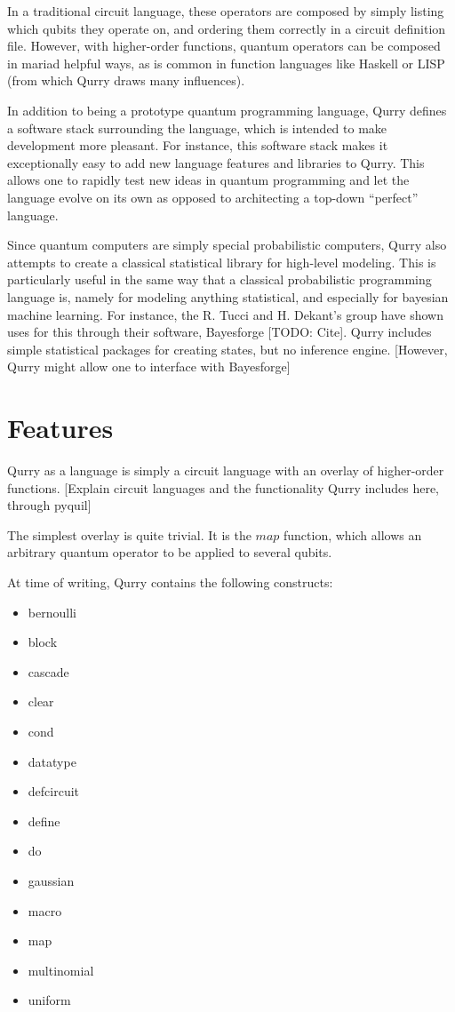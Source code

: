 \documentclass[journal]{IEEEtran}
\begin{document}
In a traditional circuit language, these operators are composed by simply listing which qubits they operate on, and ordering them correctly in a circuit definition file.
However, with higher-order functions, quantum operators can be composed in mariad helpful ways, as is common in function languages like Haskell or LISP (from which Qurry draws many influences).

In addition to being a prototype quantum programming language, Qurry defines a software stack surrounding the language, which is intended to make development more pleasant.
For instance, this software stack makes it exceptionally easy to add new language features and libraries to Qurry.
This allows one to rapidly test new ideas in quantum programming and let the language evolve on its own as opposed to architecting a top-down ``perfect'' language.

Since quantum computers are simply special probabilistic computers, Qurry also attempts to create a classical statistical library for high-level modeling. 
This is particularly useful in the same way that a classical probabilistic programming language is, namely for modeling anything statistical, and especially for bayesian machine learning.
For instance, the R. Tucci and H. Dekant's group have shown uses for this through their software, Bayesforge [TODO: Cite].
Qurry includes simple statistical packages for creating states, but no inference engine.
[However, Qurry might allow one to interface with Bayesforge]

\section{Features}

    Qurry as a language is simply a circuit language with an overlay of higher-order functions.
    [Explain circuit languages and the functionality Qurry includes here, through pyquil]

    The simplest overlay is quite trivial. It is the $map$ function, which allows an arbitrary quantum operator to be applied to several qubits.

    At time of writing, Qurry contains the following constructs:  	
    \begin{itemize}
        \item bernoulli
        \item block 	    
	    \item cascade 	    
	    \item clear 	    
	    \item cond 	    
	    \item datatype 	
	    \item defcircuit 	
	    \item define 	    
	    \item do 	        
	    \item gaussian 	
	    \item macro 	    
	    \item map 	        
	    \item multinomial 	
	    \item uniform
    \end{itemize}
\end{document}
